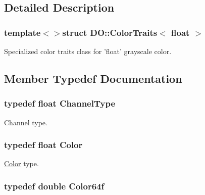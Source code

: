\subsection{Detailed Description}
\subsubsection*{template$<$$>$struct D\-O\-::\-Color\-Traits$<$ float $>$}

Specialized color traits class for 'float' grayscale color. 

\subsection{Member Typedef Documentation}
\hypertarget{struct_d_o_1_1_color_traits_3_01float_01_4_ad57b2d00f790a83a293e9712d5c1805c}{
\subsubsection[{Channel\-Type}]{\setlength{\rightskip}{0pt plus 5cm}typedef float {\bf Channel\-Type}}}\label{struct_d_o_1_1_color_traits_3_01float_01_4_ad57b2d00f790a83a293e9712d5c1805c}
Channel type. \hypertarget{struct_d_o_1_1_color_traits_3_01float_01_4_a84e40a2a68501ee9065154219636502d}{
\subsubsection[{Color}]{\setlength{\rightskip}{0pt plus 5cm}typedef float {\bf Color}}}\label{struct_d_o_1_1_color_traits_3_01float_01_4_a84e40a2a68501ee9065154219636502d}
\hyperlink{class_d_o_1_1_color}{Color} type. \hypertarget{struct_d_o_1_1_color_traits_3_01float_01_4_a9a301fd8ba0a7225e38351d3e5b2e4d3}{
\subsubsection[{Color64f}]{\setlength{\rightskip}{0pt plus 5cm}typedef double {\bf Color64f}}}\label{struct_d_o_1_1_color_traits_3_01float_01_4_a9a301fd8ba0a7225e38351d3e5b2e4d3}
